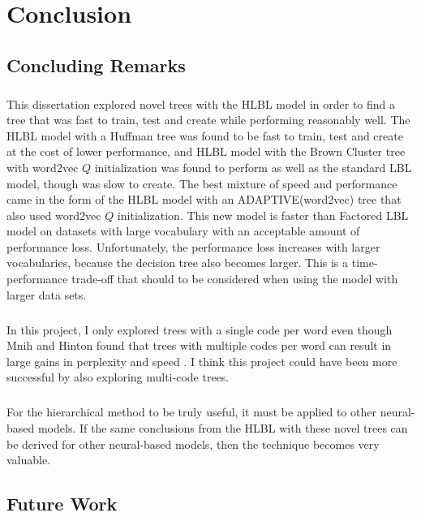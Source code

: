 
\chapter{Conclusion}

\section{Concluding Remarks}
\paragraph{}
This dissertation explored novel trees with the HLBL model in order to find a tree that was fast to train, test and create while performing reasonably well. The HLBL model with a Huffman tree was found to be fast to train, test and create at the cost of lower performance, and HLBL model with the Brown Cluster tree with word2vec $Q$ initialization was found to perform as well as the standard LBL model, though was slow to create. The best mixture of speed and performance came in the form of the HLBL model with an ADAPTIVE(word2vec) tree that also used word2vec $Q$ initialization. This new model is faster than Factored LBL model on datasets with large vocabulary with an acceptable amount of performance loss. Unfortunately, the performance loss increases with larger vocabularies, because the decision tree also becomes larger. This is a time-performance trade-off that should to be considered when using the model with larger data sets.

\paragraph{}
In this project, I only explored trees with a single code per word even though Mnih and Hinton found that trees with multiple codes per word can result in large gains in perplexity and speed \cite{MnihHinton2009}. I think this project could have been more successful by also exploring multi-code trees.

\paragraph{}
For the hierarchical method to be truly useful, it must be applied to other neural-based models. If the same conclusions from the HLBL with these novel trees can be derived for other neural-based models, then the technique becomes very valuable.

\section{Future Work}
